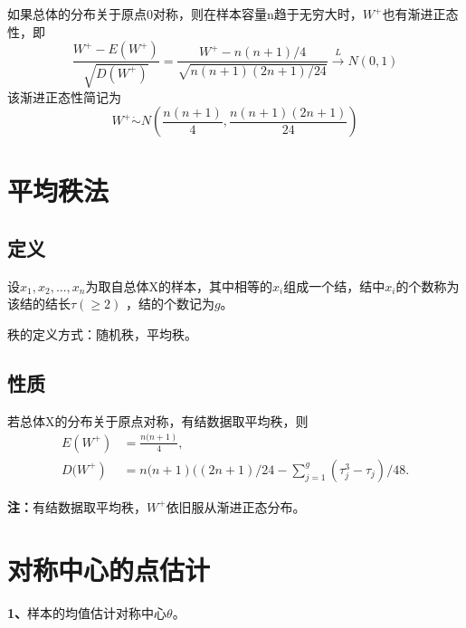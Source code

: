 \documentclass[lang=cn,10pt]{elegantbook}
\begin{document}
\begin{proposition}
    如果总体的分布关于原点0对称，则在样本容量n趋于无穷大时，$W^+$也有渐进正态性，即
    \begin{equation}
        \frac{W^+-E\left(W^+\right)}{\sqrt{D\left(W^+\right)}}
        =\frac{W^+-n\left(n+1\right)/4}{\sqrt{n\left(n+1\right)\left(2n+1\right)/24}}
        \xrightarrow{L}N(0,1)
    \end{equation}
    该渐进正态性简记为
    \begin{equation}
        W^+\dot{\sim}N(\frac{n(n+1)}{4},\frac{n(n+1)(2n+1)}{24})
    \end{equation}
\end{proposition}

\section{平均秩法}
\subsection{定义}
\begin{definition}
    设$x_1,x_2,...,x_n$为取自总体X的样本，其中相等的$x_i$组成一个结，结中$x_i$的个数称为该结的结长$\tau(\geq 2)$
    ，结的个数记为$g$。
\end{definition}
秩的定义方式：随机秩，平均秩。

\subsection{性质}
\begin{proposition}
    若总体X的分布关于原点对称，有结数据取平均秩，则
    \begin{equation}
        \begin{aligned}
            E(W^+)             & =\frac{n(\left.n+1\right)}4,                                                            \\
            D(\left.W^+\right) & =n(\left.n+1\right)(\left(2n+1\right)/24-\sum_{j=1}^{g}\left(\tau_j^3-\tau_j\right)/48.
        \end{aligned}
    \end{equation}
\end{proposition}
\textbf{注：}有结数据取平均秩，$W^+$依旧服从渐进正态分布。

\section{对称中心的点估计}
\textbf{1、}样本的均值估计对称中心$\theta$。
\end{document}
